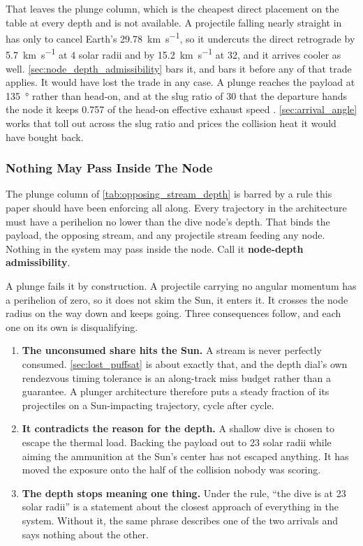 \documentclass{article}
\begin{document}
That leaves the plunge column, which is the cheapest direct placement on the table at every depth and is not available. A projectile falling nearly straight in has only to cancel Earth's \SI{29.78}{\kilo\meter\per\second}, so it undercuts the direct retrograde by \SI{5.7}{\kilo\meter\per\second} at 4 solar radii and by \SI{15.2}{\kilo\meter\per\second} at 32, and it arrives cooler as well. \autoref{sec:node_depth_admissibility} bars it, and bars it before any of that trade applies. It would have lost the trade in any case. A plunge reaches the payload at \SI{135}{\degree} rather than head-on, and at the slug ratio of 30 that the departure hands the node it keeps \num{0.757} of the head-on effective exhaust speed \cite{Katz_aim_is_all_you_need_2025}. \autoref{sec:arrival_angle} works that toll out across the slug ratio and prices the collision heat it would have bought back.

\subsubsection{Nothing May Pass Inside The Node}\label{sec:node_depth_admissibility}
The plunge column of \autoref{tab:opposing_stream_depth} is barred by a rule this paper should have been enforcing all along. Every trajectory in the architecture must have a perihelion no lower than the dive node's depth. That binds the payload, the opposing stream, and any projectile stream feeding any node. Nothing in the system may pass inside the node. Call it \textbf{node-depth admissibility}.

A plunge fails it by construction. A projectile carrying no angular momentum has a perihelion of zero, so it does not skim the Sun, it enters it. It crosses the node radius on the way down and keeps going. Three consequences follow, and each one on its own is disqualifying.

\begin{enumerate}
    \item \textbf{The unconsumed share hits the Sun.} A stream is never perfectly consumed. \autoref{sec:lost_puffsat} is about exactly that, and the depth dial's own rendezvous timing tolerance is an along-track miss budget rather than a guarantee. A plunger architecture therefore puts a steady fraction of its projectiles on a Sun-impacting trajectory, cycle after cycle.
    \item \textbf{It contradicts the reason for the depth.} A shallow dive is chosen to escape the thermal load. Backing the payload out to 23 solar radii while aiming the ammunition at the Sun's center has not escaped anything. It has moved the exposure onto the half of the collision nobody was scoring.
    \item \textbf{The depth stops meaning one thing.} Under the rule, ``the dive is at 23 solar radii'' is a statement about the closest approach of everything in the system. Without it, the same phrase describes one of the two arrivals and says nothing about the other.
\end{enumerate}
\end{document}
